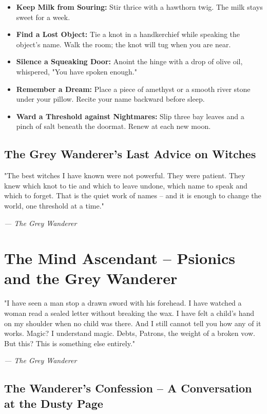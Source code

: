 \documentclass[10pt,a5paper]{book}
\begin{document}
\begin{itemize}
    \item \textbf{Keep Milk from Souring:} Stir thrice with a hawthorn twig. The milk stays sweet for a week.
    \item \textbf{Find a Lost Object:} Tie a knot in a handkerchief while speaking the object's name. Walk the room; the knot will tug when you are near.
    \item \textbf{Silence a Squeaking Door:} Anoint the hinge with a drop of olive oil, whispered, "You have spoken enough."
    \item \textbf{Remember a Dream:} Place a piece of amethyst or a smooth river stone under your pillow. Recite your name backward before sleep.
    \item \textbf{Ward a Threshold against Nightmares:} Slip three bay leaves and a pinch of salt beneath the doormat. Renew at each new moon.
\end{itemize}

\section{The Grey Wanderer's Last Advice on Witches}

\epigraph{"The best witches I have known were not powerful. They were patient. They knew which knot to tie and which to leave undone, which name to speak and which to forget. That is the quiet work of names -- and it is enough to change the world, one threshold at a time."}{\textit{--- The Grey Wanderer}}

\chapter{The Mind Ascendant -- Psionics and the Grey Wanderer}

\epigraph{"I have seen a man stop a drawn sword with his forehead. I have watched a woman read a sealed letter without breaking the wax. I have felt a child's hand on my shoulder when no child was there. And I still cannot tell you how any of it works. Magic? I understand magic. Debts, Patrons, the weight of a broken vow. But this? This is something else entirely."}{\textit{--- The Grey Wanderer}}

\section{The Wanderer's Confession -- A Conversation at the Dusty Page}
\end{document}
